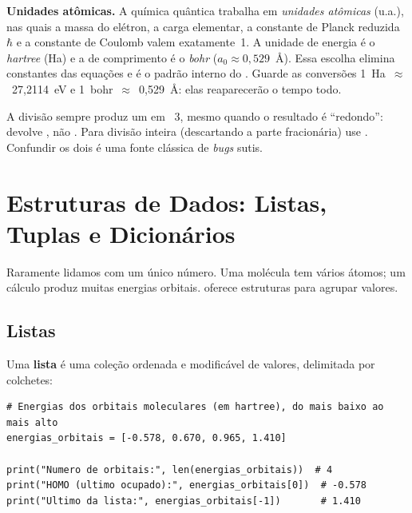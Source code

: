 \begin{caixanota}
\textbf{Unidades atômicas.} A química quântica trabalha em \emph{unidades
atômicas} (u.a.), nas quais a massa do elétron, a carga elementar, a constante
de Planck reduzida $\hbar$ e a constante de Coulomb valem exatamente~1. A unidade
de energia é o \emph{hartree} (Ha) e a de comprimento é o \emph{bohr}
($a_0 \approx 0{,}529$~Å). Essa escolha elimina constantes das equações e é o
padrão interno do \pyscf{}. Guarde as conversões
1~Ha~$\approx$~27{,}2114~eV e 1~bohr~$\approx$~0{,}529~Å: elas reaparecerão o
tempo todo.
\end{caixanota}

\begin{caixaatencao}
A divisão \code{/} sempre produz um  em \python{}~3, mesmo quando o
resultado é ``redondo'':  devolve , não . Para divisão
inteira (descartando a parte fracionária) use \code{//}. Confundir os dois é uma
fonte clássica de \emph{bugs} sutis.
\end{caixaatencao}

\section{Estruturas de Dados: Listas, Tuplas e Dicionários}
\label{sec:estruturas}

Raramente lidamos com um único número. Uma molécula tem vários átomos; um cálculo
produz muitas energias orbitais. \python{} oferece estruturas para agrupar
valores.

\subsection{Listas}

Uma \textbf{lista} é uma coleção ordenada e modificável de valores, delimitada por
colchetes:

\begin{lstlisting}[style=python,caption={Energias orbitais em uma lista.},label={lst:lista}]
# Energias dos orbitais moleculares (em hartree), do mais baixo ao mais alto
energias_orbitais = [-0.578, 0.670, 0.965, 1.410]

print("Numero de orbitais:", len(energias_orbitais))  # 4
print("HOMO (ultimo ocupado):", energias_orbitais[0])  # -0.578
print("Ultimo da lista:", energias_orbitais[-1])       # 1.410
\end{lstlisting}

